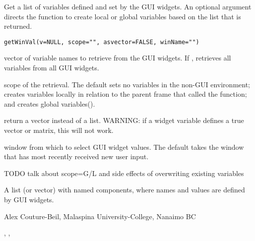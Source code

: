 \documentclass[letterpaper]{book}
\begin{document}
\begin{Description}\relax
Get a list of variables defined and set by the GUI widgets. An optional 
argument  directs the function to create local or global 
variables based on the list that is returned.
\end{Description}
\begin{Usage}
\begin{verbatim}
getWinVal(v=NULL, scope="", asvector=FALSE, winName="")
\end{verbatim}
\end{Usage}
\begin{Arguments}
\begin{ldescription}
\item[\code{v}] vector of variable names to retrieve from the GUI widgets. 
If ,  retrieves all variables from all GUI widgets.
\item[\code{scope}] scope of the retrieval. The default sets no variables in the non-GUI 
environment;  creates variables locally in relation to the 
parent frame that called the function; and  creates global variables().
\item[\code{asvector}] return a vector instead of a list. 
WARNING: if a widget variable defines a true vector or matrix, this will not work.
\item[\code{winName}] window from which to select GUI widget values. The default 
takes the window that has most recently received new user input.
\end{ldescription}
\end{Arguments}
\begin{Details}\relax
TODO talk about scope=G/L and side effects of overwriting existing variables
\end{Details}
\begin{Value}
A list (or vector) with named components, where names and values are defined by GUI widgets.
\end{Value}
\begin{Author}\relax
Alex Couture-Beil, Malaspina University-College, Nanaimo BC
\end{Author}
\begin{SeeAlso}\relax
{}, , 
\end{SeeAlso}
\end{document}
